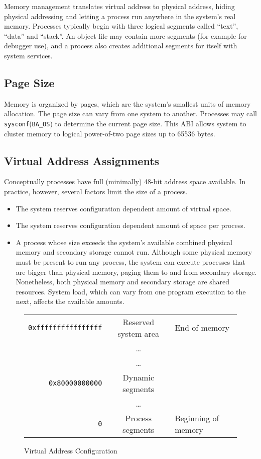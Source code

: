 Memory management translates virtual address to physical address,
hiding physical addressing and letting a process run anywhere in the
system's real memory. Processes typically begin with three logical
segments called ``text'', ``data'' and ``stack''. An object file may
contain more segments (for example for debugger use), and a process
also creates additional segments for itself with system services.

\subsection{Page Size}

Memory is organized by pages, which are the system's smallest units of
memory allocation. The page size can vary from one system to another.
Processes may call \verb|sysconf|(\verb|BA_OS|) to determine the
current page size.  This ABI allows system to cluster memory to
logical power-of-two page sizes up to 65536 bytes.

\subsection{Virtual Address Assignments}
Conceptually processes have full (minimally) 48-bit address space available.
In practice, however, several factors limit the size of a process.
\begin{itemize}
  \item The system reserves configuration dependent amount of virtual space.
  \item The system reserves configuration dependent amount of space per
    process.
  \item
    A process whose size exceeds the system's available combined physical
    memory and secondary storage cannot run. Although some physical memory
    must be present to run any process, the system can execute processes that
    are bigger than physical memory, paging them to and from secondary storage.
    Nonetheless, both physical memory and secondary storage are
    shared resources. System load, which can vary from one program execution
    to the next, affects the available amounts.
\end{itemize}

\begin{figure}[H]
  \caption{Virtual Address Configuration}
  \label{fig-address}
  \begin{center}
    \begin{tabular}{r|c|l}
      \noalign{\smallskip}  \cline{2-2}
      \verb|0xffffffffffffffff| & Reserved system area & End of memory\\ 
      & \dots & \\ \cline{2-2}
      & \dots & \\
      \verb|0x80000000000| & Dynamic segments & \\ \cline{2-2}
      & \dots & \\
      \verb|0| & Process segments & Beginning of memory\\ \cline{2-2}
    \end{tabular}
  \end{center}
\end{figure}

